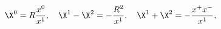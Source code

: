 \begin{equation}
\X^0=R\frac{x^0}{x^1},\quad
\X^1-\X^2=-\frac{R^2}{x^1},\quad
\X^1+\X^2=-\frac{x^+x^-}{x^1},
\label{adspara}
\end{equation}

